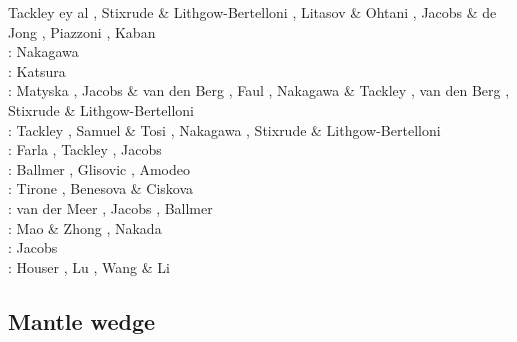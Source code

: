 \begin{scriptsize}
                   Tackley ey al \cite{tanh07}, Stixrude \& Lithgow-Bertelloni \cite{stli07}, 
                   Litasov \& Ohtani \cite{lioh07}, Jacobs \& de Jong \cite{jade07},
                   Piazzoni \etal \cite{pisb07}, Kaban \etal \cite{kart07}\\
\twothousandnine: Nakagawa \etal \cite{natd09}\\
\twothousandten: Katsura \etal \cite{kayy10}\\
\twothousandeleven: Matyska \etal \cite{mayw11}, Jacobs \& van den Berg \cite{java11}, 
                    Faul \etal \cite{faff11}, Nakagawa \& Tackley \cite{nata11}, 
                    van den Berg \etal \cite{vayj11}, Stixrude \& Lithgow-Bertelloni \cite{stli11}\\
\twothousandtwelve: Tackley \cite{tack12}, Samuel \& Tosi \cite{sato12}, 
                    Nakagawa \etal \cite{natd12}, Stixrude \& Lithgow-Bertelloni \cite{stli12}\\
\twothousandthirteen: Farla \etal \cite{fakc13}, Tackley \etal \cite{taab13}, Jacobs \etal \cite{jasv13}\\
\twothousandfifteen: Ballmer \etal \cite{basn15}, Glisovic \etal \cite{glfa15}, Amodeo \etal \cite{amsb15}\\
\twothousandsixteen: Tirone \cite{tiro16}, Benesova \& Ciskova \cite{beci16}\\
\twothousandseventeen: van der Meer \etal \cite{vavs17}, Jacobs \etal \cite{jasv17}, 
                       Ballmer \etal \cite{bahh17}\\
\twothousandeighteen: Mao \& Zhong \cite{mazh18}, Nakada \etal \cite{naoi18}\\
\twothousandnineteen: Jacobs \etal \cite{jasv19}\\
\twothousandtwenty: Houser \etal \cite{hohv20}, Lu \etal{} \cite{lufs20}, Wang \& Li \cite{wali20}
\end{scriptsize}


\subsection{Mantle wedge} 

